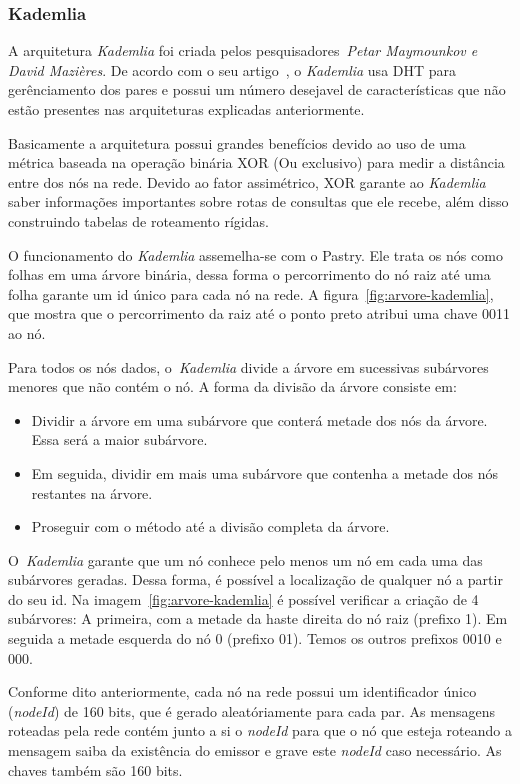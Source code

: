 \subsubsection{Kademlia}

A arquitetura \emph{Kademlia} foi criada pelos pesquisadores~\emph{Petar Maymounkov e David Mazières}. De acordo com o seu artigo~\cite{maymounkov02}, o \emph{Kademlia} usa DHT para gerênciamento dos pares e possui um número desejavel de características que não estão presentes nas arquiteturas explicadas anteriormente.

Basicamente a arquitetura possui grandes benefícios devido ao uso de uma métrica baseada na operação binária XOR (Ou exclusivo) para medir a distância entre dos nós na rede. Devido ao fator assimétrico, XOR garante ao \emph{Kademlia} saber informações importantes sobre rotas de consultas que ele recebe, além disso construindo tabelas de roteamento rígidas.

O funcionamento do \emph{Kademlia} assemelha-se com o Pastry. Ele trata os nós como folhas em uma árvore binária, dessa forma o percorrimento do nó raiz até uma folha garante um id único para cada nó na rede. A figura~\ref{fig:arvore-kademlia}, que mostra que o percorrimento da raiz até o ponto preto atribui uma chave 0011 ao nó.

Para todos os nós dados, o~\emph{Kademlia} divide a árvore em sucessivas subárvores menores que não contém o nó. A forma da divisão da árvore consiste em:
\begin{itemize}
	\item Dividir a árvore em uma subárvore que conterá metade dos nós da árvore. Essa será a maior subárvore.
	\item Em seguida, dividir em mais uma subárvore que contenha a metade dos nós restantes na árvore.
	\item Proseguir com o método até a divisão completa da árvore.
\end{itemize}
O~\emph{Kademlia} garante que um nó conhece pelo menos um nó em cada uma das subárvores geradas. Dessa forma, é possível a localização de qualquer nó a partir do seu id. Na imagem~\ref{fig:arvore-kademlia} é possível verificar a criação de 4 subárvores: A primeira, com a metade da haste direita do nó raiz (prefixo 1). Em seguida a metade esquerda do nó 0 (prefixo 01). Temos os outros prefixos 0010 e 000.

Conforme dito anteriormente, cada nó na rede possui um identificador único (\emph{nodeId}) de 160 bits, que é gerado aleatóriamente para cada par. As mensagens roteadas pela rede contém junto a si o \emph{nodeId} para que o nó que esteja roteando a mensagem saiba da existência do emissor e grave este \emph{nodeId} caso necessário. As chaves também são 160 bits.

